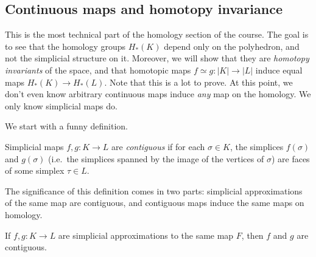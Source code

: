 \documentclass[a4paper]{article}
\begin{document}
\subsection{Continuous maps and homotopy invariance}
This is the most technical part of the homology section of the course. The goal is to see that the homology groups $H_*(K)$ depend only on the polyhedron, and not the simplicial structure on it. Moreover, we will show that they are \emph{homotopy invariants} of the space, and that homotopic maps $f \simeq g: |K| \to |L|$ induce equal maps $H_*(K) \to H_*(L)$. Note that this is a lot to prove. At this point, we don't even know arbitrary continuous maps induce \emph{any} map on the homology. We only know simplicial maps do.

We start with a funny definition.
\begin{defi}
  Simplicial maps $f, g: K \to L$ are \emph{contiguous} if for each $\sigma \in K$, the simplices $f(\sigma)$ and $g(\sigma)$ (i.e.\ the simplices spanned by the image of the vertices of $\sigma$) are faces of some simplex $\tau \in L$.
  \begin{center}
  \end{center}
\end{defi}

The significance of this definition comes in two parts: simplicial approximations of the same map are contiguous, and contiguous maps induce the same maps on homology.

\begin{lemma}
  If $f, g: K \to L$ are simplicial approximations to the same map $F$, then $f$ and $g$ are contiguous.
\end{lemma}
\end{document}

